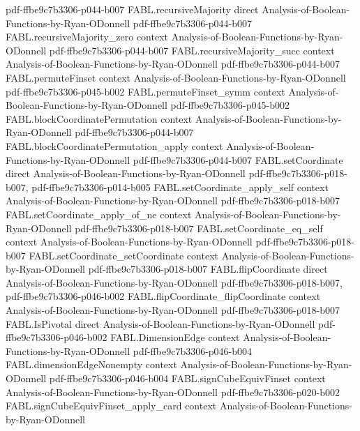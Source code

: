 \begin{theorem}
  {pdf-ffbe9c7b3306-p044-b007}
\proofstep
  {FABL.recursiveMajority}
  {direct}
  {Analysis-of-Boolean-Functions-by-Ryan-ODonnell}
  {pdf-ffbe9c7b3306-p044-b007}
\proofstep
  {FABL.recursiveMajority_zero}
  {context}
  {Analysis-of-Boolean-Functions-by-Ryan-ODonnell}
  {pdf-ffbe9c7b3306-p044-b007}
\proofstep
  {FABL.recursiveMajority_succ}
  {context}
  {Analysis-of-Boolean-Functions-by-Ryan-ODonnell}
  {pdf-ffbe9c7b3306-p044-b007}
\proofstep
  {FABL.permuteFinset}
  {context}
  {Analysis-of-Boolean-Functions-by-Ryan-ODonnell}
  {pdf-ffbe9c7b3306-p045-b002}
\proofstep
  {FABL.permuteFinset_symm}
  {context}
  {Analysis-of-Boolean-Functions-by-Ryan-ODonnell}
  {pdf-ffbe9c7b3306-p045-b002}
\proofstep
  {FABL.blockCoordinatePermutation}
  {context}
  {Analysis-of-Boolean-Functions-by-Ryan-ODonnell}
  {pdf-ffbe9c7b3306-p044-b007}
\proofstep
  {FABL.blockCoordinatePermutation_apply}
  {context}
  {Analysis-of-Boolean-Functions-by-Ryan-ODonnell}
  {pdf-ffbe9c7b3306-p044-b007}
\proofstep
  {FABL.setCoordinate}
  {direct}
  {Analysis-of-Boolean-Functions-by-Ryan-ODonnell}
  {pdf-ffbe9c7b3306-p018-b007,
    pdf-ffbe9c7b3306-p014-b005}
\proofstep
  {FABL.setCoordinate_apply_self}
  {context}
  {Analysis-of-Boolean-Functions-by-Ryan-ODonnell}
  {pdf-ffbe9c7b3306-p018-b007}
\proofstep
  {FABL.setCoordinate_apply_of_ne}
  {context}
  {Analysis-of-Boolean-Functions-by-Ryan-ODonnell}
  {pdf-ffbe9c7b3306-p018-b007}
\proofstep
  {FABL.setCoordinate_eq_self}
  {context}
  {Analysis-of-Boolean-Functions-by-Ryan-ODonnell}
  {pdf-ffbe9c7b3306-p018-b007}
\proofstep
  {FABL.setCoordinate_setCoordinate}
  {context}
  {Analysis-of-Boolean-Functions-by-Ryan-ODonnell}
  {pdf-ffbe9c7b3306-p018-b007}
\proofstep
  {FABL.flipCoordinate}
  {direct}
  {Analysis-of-Boolean-Functions-by-Ryan-ODonnell}
  {pdf-ffbe9c7b3306-p018-b007,
    pdf-ffbe9c7b3306-p046-b002}
\proofstep
  {FABL.flipCoordinate_flipCoordinate}
  {context}
  {Analysis-of-Boolean-Functions-by-Ryan-ODonnell}
  {pdf-ffbe9c7b3306-p018-b007}
\proofstep
  {FABL.IsPivotal}
  {direct}
  {Analysis-of-Boolean-Functions-by-Ryan-ODonnell}
  {pdf-ffbe9c7b3306-p046-b002}
\proofstep
  {FABL.DimensionEdge}
  {context}
  {Analysis-of-Boolean-Functions-by-Ryan-ODonnell}
  {pdf-ffbe9c7b3306-p046-b004}
\proofstep
  {FABL.dimensionEdgeNonempty}
  {context}
  {Analysis-of-Boolean-Functions-by-Ryan-ODonnell}
  {pdf-ffbe9c7b3306-p046-b004}
\proofstep
  {FABL.signCubeEquivFinset}
  {context}
  {Analysis-of-Boolean-Functions-by-Ryan-ODonnell}
  {pdf-ffbe9c7b3306-p020-b002}
\proofstep
  {FABL.signCubeEquivFinset_apply_card}
  {context}
  {Analysis-of-Boolean-Functions-by-Ryan-ODonnell}

\end{theorem}
